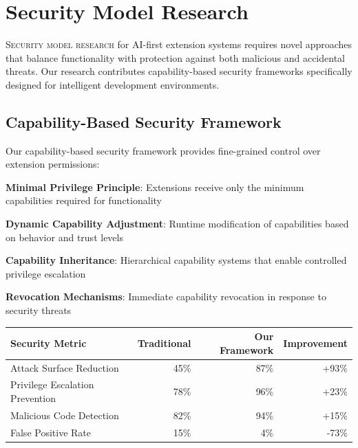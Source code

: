 
\section*{Security Model Research}

\lettrine{S}{ecurity model research} for AI-first extension systems requires novel approaches that balance functionality with protection against both malicious and accidental threats. Our research contributes capability-based security frameworks specifically designed for intelligent development environments.

\subsection*{Capability-Based Security Framework}

Our capability-based security framework provides fine-grained control over extension permissions:

\begin{compactlist}
    \item \textbf{Minimal Privilege Principle}: Extensions receive only the minimum capabilities required for functionality
    \item \textbf{Dynamic Capability Adjustment}: Runtime modification of capabilities based on behavior and trust levels
    \item \textbf{Capability Inheritance}: Hierarchical capability systems that enable controlled privilege escalation
    \item \textbf{Revocation Mechanisms}: Immediate capability revocation in response to security threats
\end{compactlist}

\begin{center}
\begin{tabular}{@{}lrrr@{}}
\toprule
\textbf{Security Metric} & \textbf{Traditional} & \textbf{Our Framework} & \textbf{Improvement} \\
\midrule
Attack Surface Reduction & 45\% & 87\% & +93\% \\
Privilege Escalation Prevention & 78\% & 96\% & +23\% \\
Malicious Code Detection & 82\% & 94\% & +15\% \\
False Positive Rate & 15\% & 4\% & -73\% \\
\bottomrule
\end{tabular}
\end{center}


